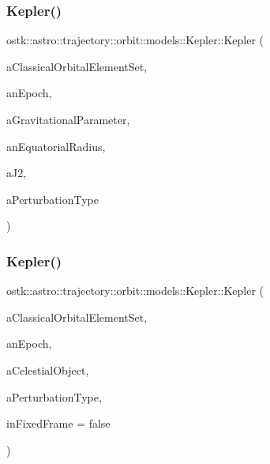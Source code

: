 \subsubsection{\texorpdfstring{Kepler()}{Kepler()}\hspace{0.1cm}{\footnotesize\ttfamily [1/2]}}
{\footnotesize\ttfamily ostk\+::astro\+::trajectory\+::orbit\+::models\+::\+Kepler\+::\+Kepler (\begin{DoxyParamCaption}\item[{const \hyperlink{classostk_1_1astro_1_1trajectory_1_1orbit_1_1models_1_1kepler_1_1_c_o_e}{C\+OE} \&}]{a\+Classical\+Orbital\+Element\+Set,  }\item[{const Instant \&}]{an\+Epoch,  }\item[{const Derived \&}]{a\+Gravitational\+Parameter,  }\item[{const Length \&}]{an\+Equatorial\+Radius,  }\item[{const Real \&}]{a\+J2,  }\item[{const \hyperlink{classostk_1_1astro_1_1trajectory_1_1orbit_1_1models_1_1_kepler_a3750f9177ff06a1938826e2c2881d5a9}{Kepler\+::\+Perturbation\+Type} \&}]{a\+Perturbation\+Type }\end{DoxyParamCaption})}

\mbox{\label{classostk_1_1astro_1_1trajectory_1_1orbit_1_1models_1_1_kepler_afc95c7ec38bba8e24eba704c408523b6}} 
\subsubsection{\texorpdfstring{Kepler()}{Kepler()}\hspace{0.1cm}{\footnotesize\ttfamily [2/2]}}
{\footnotesize\ttfamily ostk\+::astro\+::trajectory\+::orbit\+::models\+::\+Kepler\+::\+Kepler (\begin{DoxyParamCaption}\item[{const \hyperlink{classostk_1_1astro_1_1trajectory_1_1orbit_1_1models_1_1kepler_1_1_c_o_e}{C\+OE} \&}]{a\+Classical\+Orbital\+Element\+Set,  }\item[{const Instant \&}]{an\+Epoch,  }\item[{const Celestial \&}]{a\+Celestial\+Object,  }\item[{const \hyperlink{classostk_1_1astro_1_1trajectory_1_1orbit_1_1models_1_1_kepler_a3750f9177ff06a1938826e2c2881d5a9}{Kepler\+::\+Perturbation\+Type} \&}]{a\+Perturbation\+Type,  }\item[{const bool}]{in\+Fixed\+Frame = {\ttfamily false} }\end{DoxyParamCaption})}



